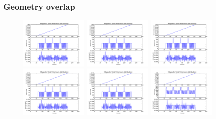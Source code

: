 \documentclass[10pt, xcolor=dvipsnames]{beamer}
\begin{document}
\begin{frame}
  \frametitle{Geometry overlap}
  \begin{figure}
    \includegraphics[width=0.3\textwidth]{sine_goverlap_3}
    \includegraphics[width=0.3\textwidth]{sine_goverlap_4}
    \includegraphics[width=0.3\textwidth]{sine_goverlap_5}\\
    \includegraphics[width=0.3\textwidth]{sine_goverlap_6}
    \includegraphics[width=0.3\textwidth]{sine_goverlap_7}
    \includegraphics[width=0.3\textwidth]{sine_goverlap_8}
  \end{figure}
\end{frame}
\end{document}
